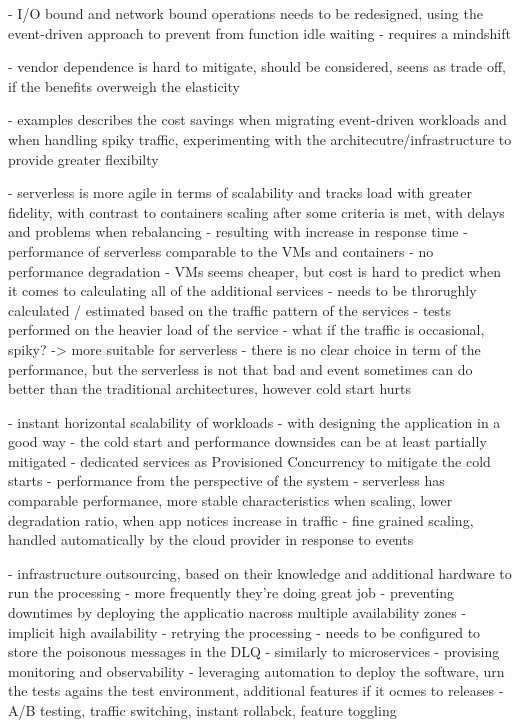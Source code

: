 \label{chapter:serverless-suitability-operation-types}
- I/O bound and network bound operations needs to be redesigned, using the event-driven approach to prevent from function idle waiting - requires a mindshift

\label{chapter:serverless-suitability-vendor-dependence}
- vendor dependence is hard to mitigate, should be considered, seens as trade off, if the benefits overweigh the elasticity

\label{chapter:serverless-suitability-for-web-based-workloads}
- examples describes the cost savings when migrating event-driven workloads and when handling spiky traffic, experimenting with the architecutre/infrastructure to provide greater flexibilty

\label{chapter:comparison-with-traditional-architectures}
- serverless is more agile in terms of scalability and tracks load with greater fidelity, with contrast to containers scaling after some criteria is met, with delays and problems when rebalancing - resulting with increase in response time
- performance of serverless comparable to the VMs and containers - no performance degradation
- VMs seems cheaper, but cost is hard to predict when it comes to calculating all of the additional services - needs to be throrughly calculated / estimated based on the traffic pattern of the services
- tests performed on the heavier load of the service - what if the traffic is occasional, spiky? -> more suitable for serverless
- there is no clear choice in term of the performance, but the serverless is not that bad and event sometimes can do better than the traditional architectures, however cold start hurts

\label{chapter:serverless-suitability-performance-and-scalability}
- instant horizontal scalability of workloads
- with designing the application in a good way - the cold start and performance downsides can be at least partially mitigated
- dedicated services as Provisioned Concurrency to mitigate the cold starts
- performance from the perspective of the system - serverless has comparable performance, more stable characteristics when scaling, lower degradation ratio, when app notices increase in traffic
- fine grained scaling, handled automatically by the cloud provider in response to events

\label{chapter:serverless-suitability-reliability}
- infrastructure outsourcing, based on their knowledge and additional hardware to run the processing - more frequently they're doing great job
- preventing downtimes by deploying the applicatio nacross multiple availability zones
- implicit high availability - retrying the processing - needs to be configured to store the poisonous messages in the DLQ
- similarly to microservices - provising monitoring and observability - leveraging automation to deploy the software, urn the tests agains the test environment, additional features if it ocmes to releases - A/B testing, traffic switching, instant rollabck, feature toggling

